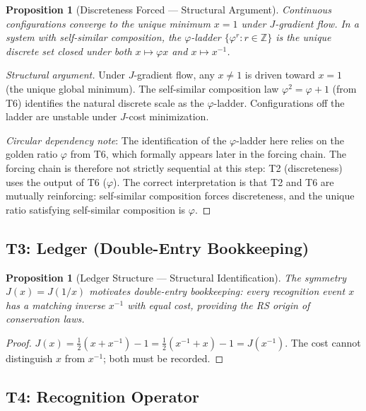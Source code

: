 \documentclass[12pt,a4paper]{article}
\newtheorem{proposition}[theorem]{Proposition}
\theoremstyle{definition}
\theoremstyle{remark}
\begin{document}
\begin{proposition}[Discreteness Forced --- Structural Argument]
Continuous configurations converge to the unique minimum $x = 1$ under
$J$-gradient flow.  In a system with self-similar composition, the
$\varphi$-ladder $\{\varphi^r : r \in \mathbb{Z}\}$ is the unique
discrete set closed under both $x \mapsto \varphi x$ and $x \mapsto x^{-1}$.
\end{proposition}

\begin{proof}[Structural argument]
Under $J$-gradient flow, any $x \neq 1$ is driven toward $x = 1$
(the unique global minimum).  The self-similar composition law
$\varphi^2 = \varphi + 1$ (from T6) identifies the natural discrete
scale as the $\varphi$-ladder.  Configurations off the ladder are
unstable under $J$-cost minimization.

\emph{Circular dependency note}: The identification of the
$\varphi$-ladder here relies on the golden ratio $\varphi$ from
T6, which formally appears later in the forcing chain.  The forcing
chain is therefore not strictly sequential at this step: T2 (discreteness)
uses the output of T6 ($\varphi$).  The correct interpretation is that
T2 and T6 are mutually reinforcing: self-similar composition forces
discreteness, and the unique ratio satisfying self-similar composition
is $\varphi$.
\end{proof}

\subsection{T3: Ledger (Double-Entry Bookkeeping)}

\begin{proposition}[Ledger Structure --- Structural Identification]
The symmetry $J(x) = J(1/x)$ motivates double-entry bookkeeping:
every recognition event $x$ has a matching inverse $x^{-1}$ with
equal cost, providing the RS origin of conservation laws.
\end{proposition}

\begin{proof}
$J(x) = \tfrac{1}{2}(x + x^{-1}) - 1 = \tfrac{1}{2}(x^{-1} + x) - 1
= J(x^{-1})$.  The cost cannot distinguish $x$ from $x^{-1}$;
both must be recorded.
\end{proof}

\subsection{T4: Recognition Operator}
\end{document}
